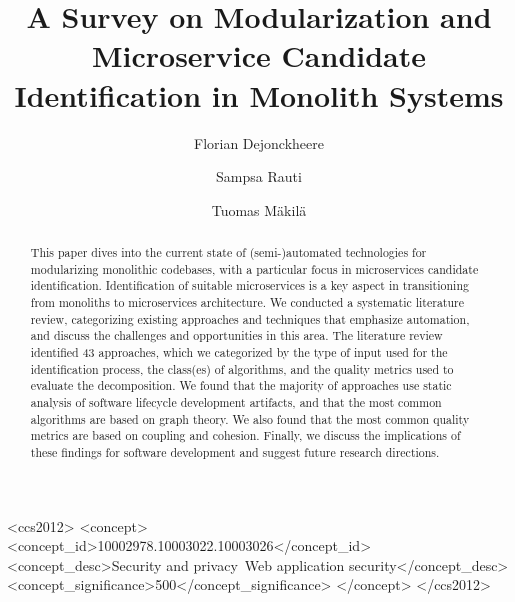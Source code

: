 \documentclass[sigconf]{acmart}
\begin{document}
	\title{A Survey on Modularization and Microservice Candidate Identification in Monolith Systems}

	\author{Florian Dejonckheere}
	\affiliation{
		\institution{}
		\city{}
		\country{}
	}

	\author{Sampsa Rauti}

	\author{Tuomas Mäkilä}

	\begin{abstract}
		This paper dives into the current state of (semi-)automated technologies for modularizing monolithic codebases, with a particular focus in microservices candidate identification.
		Identification of suitable microservices is a key aspect in transitioning from monoliths to microservices architecture.
		We conducted a systematic literature review, categorizing existing approaches and techniques that emphasize automation, and discuss the challenges and opportunities in this area.
		The literature review identified 43 approaches, which we categorized by the type of input used for the identification process, the class(es) of algorithms, and the quality metrics used to evaluate the decomposition.
		We found that the majority of approaches use static analysis of software lifecycle development artifacts, and that the most common algorithms are based on graph theory.
		We also found that the most common quality metrics are based on coupling and cohesion.
		Finally, we discuss the implications of these findings for software development and suggest future research directions.
	\end{abstract}

	\begin{CCSXML}
		<ccs2012>
		<concept>
		<concept_id>10002978.10003022.10003026</concept_id>
		<concept_desc>Security and privacy~Web application security</concept_desc>
		<concept_significance>500</concept_significance>
		</concept>
		</ccs2012>
	\end{CCSXML}



	\maketitle
\end{document}
